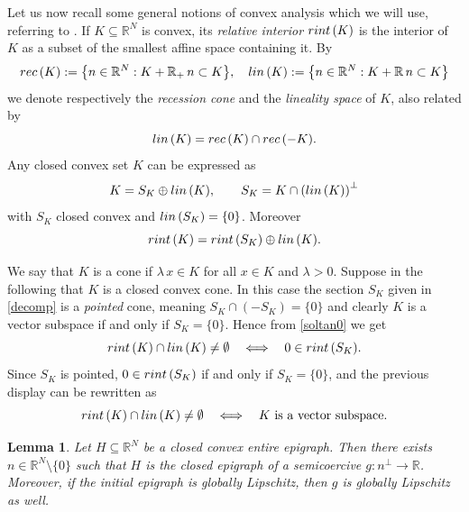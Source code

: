 \documentclass[12pt]{amsart}
\numberwithin{equation}{section}
\theoremstyle{plain}
\newtheorem{lemma}[theorem]{Lemma}
\theoremstyle{plain}
\theoremstyle{plain}
\theoremstyle{definition}
\newcommand{\R}{{\mathbb R}}
\newcommand{\beq}{\begin{equation}}
\newcommand{\eeq}{\end{equation}}
\begin{document}
Let us now recall some general notions of convex analysis which we will use, referring to \cite{Roc96}. 
If $K\subseteq\R^N$ is convex, its {\em relative interior} ${\rm rint}\, (K)$ is the interior of $K$ as a subset of the smallest affine space containing it. 
 By 
\[
{\rm rec}\, (K) := \big\{n\in \R^N: K+\R_+\, n \subset K \big\}, \quad {\rm lin}\, (K):= \big\{n\in \R^N: K+\R\, n \subset K \big\}
\]
we denote respectively the \emph{recession cone} and the {\em lineality space} of $K$, also related by
\[
{\rm lin}\, (K)={\rm rec}\, (K)\cap {\rm rec}\, (-K).
\]
Any closed convex set $K$ can be expressed as 
\beq
\label{decomp}
K=S_K\oplus {\rm lin}\, (K) , \qquad S_K=K\cap \left({\rm lin}\, (K)\right)^\bot
\eeq
with $S_K$ closed convex and ${\rm lin}\, (S_K)=\{0\}$. 
Moreover 
\beq
\label{soltan0}
{\rm rint}\, (K)={\rm rint}\, (S_K)\oplus {\rm lin}\, (K).
\eeq

We say that $K$ is a cone if $\lambda\, x\in K$ for all $x\in K$ and $\lambda>0$. 
Suppose in the following that $K$ is a closed convex cone. In this case the section $S_K$ given in \eqref{decomp} is a {\em pointed} cone, meaning $S_K\cap (-S_K)=\{0\}$ and clearly $K$ is a vector subspace if and only if $S_K=\{0\}$. 
Hence from \eqref{soltan0} we get
\[
{\rm rint}\, (K)\cap {\rm lin}\, (K)\neq \emptyset\quad \Longleftrightarrow\quad 0\in {\rm rint}\, (S_K).
\]
Since $S_K$ is pointed, $0\in {\rm rint}\, (S_K)$ if and only if $S_K=\{0\}$, and the previous display can be rewritten as 
\beq
\label{soltan}
{\rm rint}\, (K)\cap {\rm lin}\, (K)\neq \emptyset\quad \Longleftrightarrow\quad K \text{ is a vector subspace}.
\eeq

\begin{lemma}
\label{lem_rotation}
Let $H\subseteq \R^N$ be a closed convex entire epigraph. 
Then there exists $n\in \R^N\setminus\{0\}$ such that $H$ is the closed epigraph of a semicoercive $g:n^\perp\to \R$. 
Moreover, if the initial epigraph is globally Lipschitz, then $g$ is globally Lipschitz as well.
\end{lemma}
\end{document}
